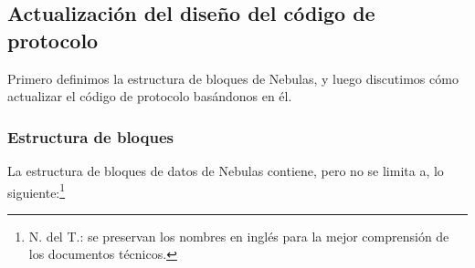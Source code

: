 \subsection{Actualización del diseño del código de protocolo}

Primero definimos la estructura de bloques de Nebulas, y luego discutimos cómo actualizar el código de protocolo basándonos en él.

\subsubsection{Estructura de bloques}

La estructura de bloques de datos de Nebulas contiene, pero no se limita a, lo siguiente:\footnote{N. del T.: se preservan los nombres en inglés para la mejor comprensión de los documentos técnicos.}

